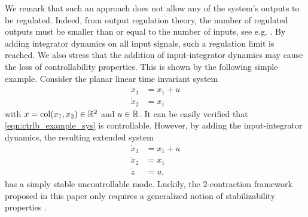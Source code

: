 \documentclass{ifacconf}
\begin{document}
We remark that such an approach does not allow any of the system's outputs to be regulated. Indeed, from output regulation theory, the number of regulated outputs must be smaller than or equal to the number of inputs, see e.g. \cite{isidori2003robust}. By adding integrator dynamics on all input signals, such a regulation limit is reached.
We also stress that the addition of input-integrator dynamics may cause the loss of controllability properties. This is shown by the following simple example.
Consider the planar linear time invariant system
\begin{equation}
    \label{eqn:ctrlb_example_sys}
    \begin{array}{rl}
     \dot x_1&= x_1+u  \\
     \dot x_2 &= x_1 
\end{array}
\end{equation}
with $x=\operatorname{col}(x_1,x_2)\in{\mathbb{R}}^2$ and $u\in{\mathbb{R}}$. It can be easily verified that \eqref{eqn:ctrlb_example_sys} is controllable. However, by adding the input-integrator dynamics, the resulting extended system
\[
    \begin{array}{rl}
     \dot x_1&= x_1+u  \\
     \dot x_2 &= x_1 \\
     \dot z &= u,
\end{array}
\]
has a simply stable uncontrollable mode. Luckily, the $2$-contraction framework proposed in this paper only requires a generalized notion of stabilizability properties \citep{cecilia2023generalized}.
\end{document}
